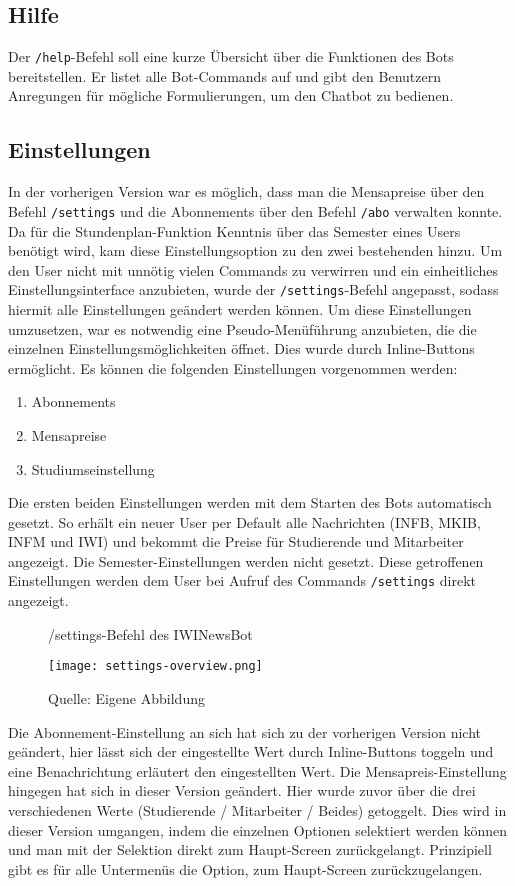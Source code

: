 \subsection{Hilfe}
Der \texttt{/help}-Befehl soll eine kurze Übersicht über die Funktionen des Bots bereitstellen. Er listet alle Bot-Commands auf und gibt den Benutzern Anregungen für mögliche Formulierungen, um den Chatbot zu bedienen.

\subsection{Einstellungen}
In der vorherigen Version war es möglich, dass man die Mensapreise über den Befehl \texttt{/settings} und die Abonnements über den Befehl \texttt{/abo} verwalten konnte. Da für die Stundenplan-Funktion Kenntnis über das Semester eines Users benötigt wird, kam diese Einstellungsoption zu den zwei bestehenden hinzu. Um den User nicht mit unnötig vielen Commands zu verwirren und ein einheitliches Einstellungsinterface anzubieten, wurde der \texttt{/settings}-Befehl angepasst, sodass hiermit alle Einstellungen geändert werden können.
Um diese Einstellungen umzusetzen, war es notwendig eine Pseudo-Menüführung anzubieten, die die einzelnen Einstellungsmöglichkeiten öffnet. Dies wurde durch Inline-Buttons ermöglicht. Es können die folgenden Einstellungen vorgenommen werden:
\begin{enumerate}[noitemsep]
    \item Abonnements
    \item Mensapreise
    \item Studiumseinstellung
\end{enumerate}
Die ersten beiden Einstellungen werden mit dem Starten des Bots automatisch gesetzt. So erhält ein neuer User per Default alle Nachrichten (INFB, MKIB, INFM und IWI) und bekommt die Preise für Studierende und Mitarbeiter angezeigt. Die Semester-Einstellungen werden nicht gesetzt.
Diese getroffenen Einstellungen werden dem User bei Aufruf des Commands \texttt{/settings} direkt angezeigt.

\begin{figure}[H]
    \centering
    \caption{/settings-Befehl des IWINewsBot}
      \texttt{[image: settings-overview.png]}
      \label{img:settings}
    \caption*{Quelle: Eigene Abbildung}
\end{figure}

Die Abonnement-Einstellung an sich hat sich zu der vorherigen Version nicht geändert, hier lässt sich der eingestellte Wert durch Inline-Buttons toggeln und eine Benachrichtung erläutert den eingestellten Wert. Die Mensapreis-Einstellung hingegen hat sich in dieser Version geändert. Hier wurde zuvor über die drei verschiedenen Werte (Studierende / Mitarbeiter / Beides) getoggelt. Dies wird in dieser Version umgangen, indem die einzelnen Optionen selektiert werden können und man mit der Selektion direkt zum Haupt-Screen zurückgelangt. Prinzipiell gibt es für alle Untermenüs die Option, zum Haupt-Screen zurückzugelangen.

